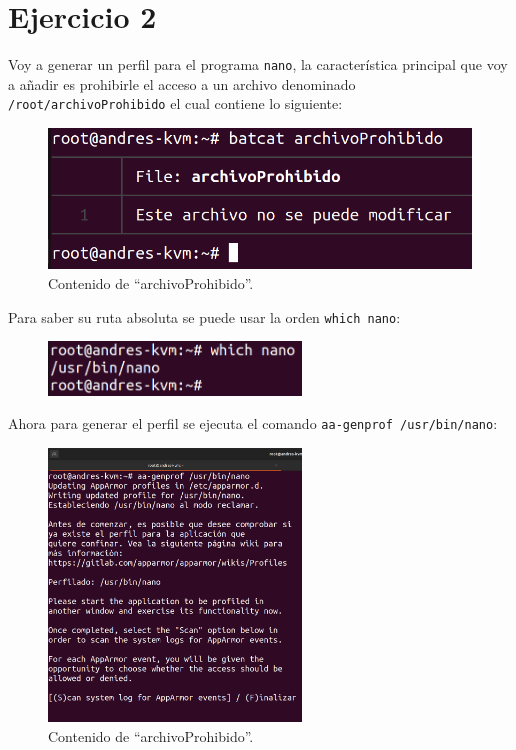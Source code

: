 \documentclass{article}
\begin{document}
\section*{Ejercicio 2}
Voy a generar un perfil para el programa \verb|nano|, la característica principal que voy a añadir es prohibirle el acceso a un archivo denominado \verb|/root/archivoProhibido| el cual contiene lo siguiente:


\begin{figure}[H]
    \centering
    \includegraphics[width=\textwidth]{imagenes/Captura desde 2022-10-18 16-41-05.png}
    \caption{Contenido de ``archivoProhibido''.}
\end{figure}

\bigskip

Para saber su ruta absoluta se puede usar la orden \verb|which nano|:


\begin{figure}[H]
    \centering
    \includegraphics[width=0.6\textwidth]{imagenes/which.png}
\end{figure}

Ahora para generar el perfil se ejecuta el comando \verb|aa-genprof /usr/bin/nano|:

\begin{figure}[H]
    \centering
    \includegraphics[width=0.6\textwidth]{imagenes/Captura desde 2022-10-18 16-41-31.png}
    \caption{Contenido de ``archivoProhibido''.}
\end{figure}
\end{document}
